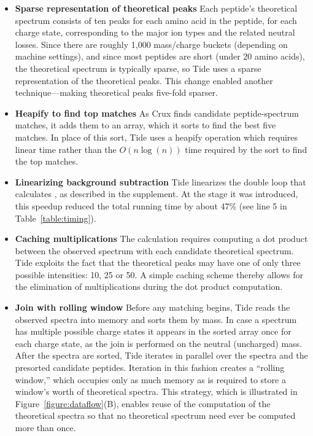 \begin{itemize}

\item {\bf Sparse representation of theoretical peaks} Each peptide's
  theoretical spectrum consists of ten peaks for each amino acid in
  the peptide, for each charge state, corresponding to the major ion
  types and the related neutral losses. Since there are roughly 1,000
  mass/charge buckets (depending on machine settings), and since most
  peptides are short (under 20 amino acids), the theoretical spectrum
  is typically sparse, so Tide uses a sparse representation of the
  theoretical peaks. This change enabled another technique---making
  theoretical peaks five-fold sparser.

\item {\bf Heapify to find top matches} As Crux finds candidate
  peptide-spectrum matches, it adds them to an array, which it sorts
  to find the best five matches. In place of this sort, Tide uses a
  heapify operation which requires linear time rather than the $O(n
  \log(n))$ time required by the sort to find the top matches.

\item {\bf Linearizing background subtraction} Tide linearizes the
  double loop that calculates \XCorr, as described in the supplement.
  At the stage it was introduced, this speedup reduced the total
  running time by about 47\% (see line 5 in Table~\ref{table:timing}).

\item {\bf Caching multiplications} The \XCorr calculation requires
  computing a dot product between the observed spectrum with each
  candidate theoretical spectrum.  Tide exploits the fact that the
  theoretical peaks may have one of only three possible intensities:
  10, 25 or 50.  A simple caching scheme thereby allows for the
  elimination of multiplications during the dot product computation.

\item {\bf Join with rolling window} Before any matching begins, Tide
  reads the observed spectra into memory and sorts them by mass.  In
  case a spectrum has multiple possible charge states it appears in
  the sorted array once for each charge state, as the join is
  performed on the neutral (uncharged) mass.  After the spectra are
  sorted, Tide iterates in parallel over the spectra and the
  presorted candidate peptides.  Iteration in this fashion creates a
  ``rolling window,'' which occupies only as much memory as is
  required to store a window's worth of theoretical spectra. This
  strategy, which is illustrated in Figure~\ref{figure:dataflow}(B),
  enables reuse of the computation of the theoretical spectra so that
  no theoretical spectrum need ever be computed more than once.


\end{itemize}
